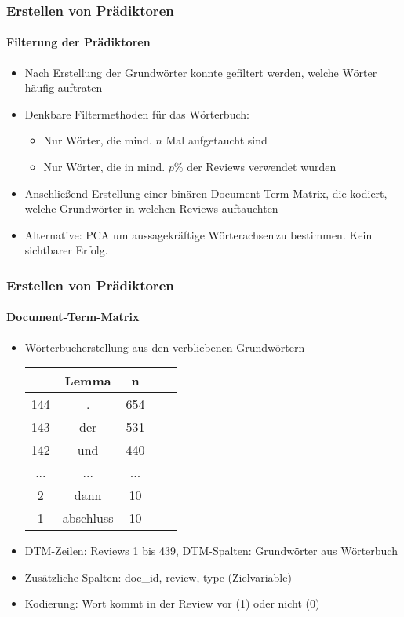 \begin{frame}
\frametitle{Erstellen von Prädiktoren}
\framesubtitle{Filterung der Prädiktoren}
\begin{itemize}\itemsep12pt
\item Nach Erstellung der Grundwörter konnte gefiltert werden, welche Wörter häufig auftraten
\item Denkbare Filtermethoden für das Wörterbuch:
\begin{itemize}
\item Nur Wörter, die mind. $n$ Mal aufgetaucht sind 
\item Nur Wörter, die in mind. $p\%$ der Reviews verwendet wurden
\end{itemize} 
\item Anschließend Erstellung einer binären Document-Term-Matrix, die kodiert, welche Grundwörter in welchen Reviews auftauchten
\item Alternative: PCA um aussagekräftige \glqq Wörterachsen\grqq \,zu bestimmen. Kein sichtbarer Erfolg.
\end{itemize}
\end{frame}

\begin{frame}
\frametitle{Erstellen von Prädiktoren}
\framesubtitle{Document-Term-Matrix}
\begin{itemize}\itemsep12pt
\item Wörterbucherstellung aus den verbliebenen Grundwörtern\\
\begin{center}
\begin{tabular}{|c|c|c|c|c|}
\hline
		& Lemma 	& n	\\
\hline
144 	& .		& 654\\
143	 	& der	& 531\\
142 	& und	& 440\\
...		& ...	& ...\\
2		& dann & 10\\
1		& abschluss & 10\\
\hline
\end{tabular}
 \end{center}

\item DTM-Zeilen: Reviews 1 bis 439, DTM-Spalten: Grundwörter aus Wörterbuch
\item Zusätzliche Spalten: doc\_id, review, type (Zielvariable) 
\item Kodierung: Wort kommt in der Review vor (1) oder nicht (0)
\end{itemize}
\end{frame}

